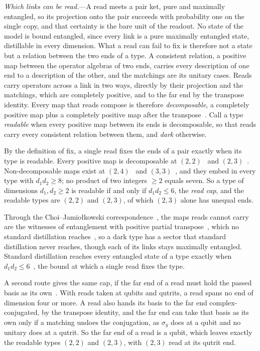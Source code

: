\documentclass[aps,prl,reprint,superscriptaddress,longbibliography,nofootinbib,floatfix]{revtex4-2}
\theoremstyle{definition}
\begin{document}
\emph{Which links can be read.}---A read meets a pair ket, pure and maximally entangled, so its projection onto the pair succeeds with probability one on the single copy, and that certainty is the bare unit of the readout. No state of the model is bound entangled, since every link is a pure maximally entangled state, distillable in every dimension. What a read can fail to fix is therefore not a state but a relation between the two ends of a type. A consistent relation, a positive map between the operator algebras of two ends, carries every description of one end to a description of the other, and the matchings are its unitary cases. Reads carry operators across a link in two ways, directly by their projection and the matchings, which are completely positive, and to the far end by the transpose identity. Every map that reads compose is therefore \emph{decomposable}, a completely positive map plus a completely positive map after the transpose~\cite{SM}. Call a type \emph{readable} when every positive map between its ends is decomposable, so that reads carry every consistent relation between them, and \emph{dark} otherwise.

By the definition of fix, a single read fixes the ends of a pair exactly when its type is readable. Every positive map is decomposable at $(2,2)$~\cite{stormer1963} and $(2,3)$~\cite{woronowicz}. Non-decomposable maps exist at $(2,4)$~\cite{woronowicz} and $(3,3)$~\cite{choi1975}, and they embed in every type with $d_{1}d_{2}\geq 8$; no product of two integers $\geq 2$ equals seven. So a type of dimensions $d_{1},d_{2}\geq 2$ is readable if and only if $d_{1}d_{2}\leq 6$, the \emph{read cap}, and the readable types are $(2,2)$ and $(2,3)$, of which $(2,3)$ alone has unequal ends.

Through the Choi--Jamio{\l}kowski correspondence~\cite{choi1975cp,jamiolkowski1972}, the maps reads cannot carry are the witnesses of entanglement with positive partial transpose~\cite{horodecki1996,phorodecki1997}, which no standard distillation reaches~\cite{horodecki1998}, so a dark type has a sector that standard distillation never reaches, though each of its links stays maximally entangled. Standard distillation reaches every entangled state of a type exactly when $d_{1}d_{2}\leq 6$~\cite{horodecki1999,horodecki2009}, the bound at which a single read fixes the type.

A second route gives the same cap, if the far end of a read must hold the passed basis as its own~\cite{SM}. With reads taken at qubits and qutrits, a read spans no end of dimension four or more. A read also hands its basis to the far end complex-conjugated, by the transpose identity, and the far end can take that basis as its own only if a matching undoes the conjugation, as $\sigma_{y}$ does at a qubit and no unitary does at a qutrit. So the far end of a read is a qubit, which leaves exactly the readable types $(2,2)$ and $(2,3)$, with $(2,3)$ read at its qutrit end.
\end{document}
